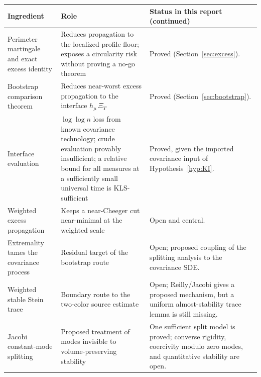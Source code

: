 \documentclass[../../main.tex]{subfiles}
\begin{document}
\begin{center}
\begin{tabularx}{\textwidth}{@{}>{\raggedright\arraybackslash}p{}>{\raggedright\arraybackslash}p{}Y@{}}
\toprule
Ingredient & Role & Status in this report (continued) \\
\midrule
Perimeter martingale and exact excess identity & Reduces propagation to the localized profile floor; exposes a circularity risk without proving a no-go theorem & Proved (Section~\ref{sec:excess}). \\
\addlinespace
Bootstrap comparison theorem & Reduces near-worst excess propagation to the interface $h_\mu\,\Xi_T$ & Proved (Section~\ref{sec:bootstrap}). \\
\addlinespace
Interface evaluation & $\log\log n$ loss from known covariance technology; crude evaluation provably insufficient; a relative bound for all measures at a sufficiently small universal time is KLS-sufficient & Proved, given the imported covariance input of Hypothesis~\ref{hyp:KI}. \\
\addlinespace
Weighted excess propagation & Keeps a near-Cheeger cut near-minimal at the weighted scale & Open and central. \\
\addlinespace
Extremality tames the covariance process & Residual target of the bootstrap route & Open; proposed coupling of the splitting analysis to the covariance SDE. \\
\addlinespace
Weighted stable Stein trace & Boundary route to the two-color source estimate & Open; Reilly/Jacobi gives a proposed mechanism, but a uniform almost-stability trace lemma is still missing. \\
\addlinespace
Jacobi constant-mode splitting & Proposed treatment of modes invisible to volume-preserving stability & One sufficient split model is proved; converse rigidity, coercivity modulo zero modes, and quantitative stability are open. \\
\bottomrule
\end{tabularx}
\end{center}
\end{document}
